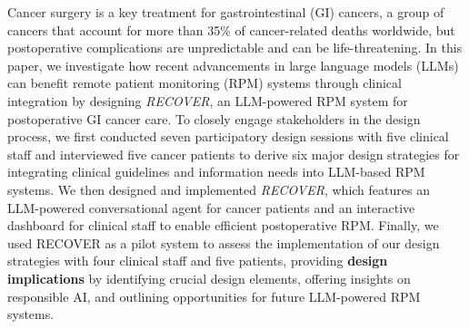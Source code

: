



Cancer surgery is a key treatment for gastrointestinal (GI) cancers, a group of cancers that account for more than 35\% of cancer-related deaths worldwide, but postoperative complications are unpredictable and can be life-threatening. In this paper, we investigate how recent advancements in large language models (LLMs) can benefit remote patient monitoring (RPM) systems through clinical integration by designing \textit{RECOVER}, an LLM-powered RPM system for postoperative GI cancer care. To closely engage stakeholders in the design process, we first conducted seven participatory design sessions with five clinical staff and interviewed five cancer patients to derive six major design strategies for integrating clinical guidelines and information needs into LLM-based RPM systems. We then designed and implemented \textit{RECOVER}, which features an LLM-powered conversational agent for cancer patients and an interactive dashboard for clinical staff to enable efficient postoperative RPM. Finally, we used RECOVER as a pilot system to assess the implementation of our design strategies with four clinical staff and five patients, providing \textbf{design implications} by identifying crucial design elements, offering insights on responsible AI, and outlining opportunities for future LLM-powered RPM systems.
